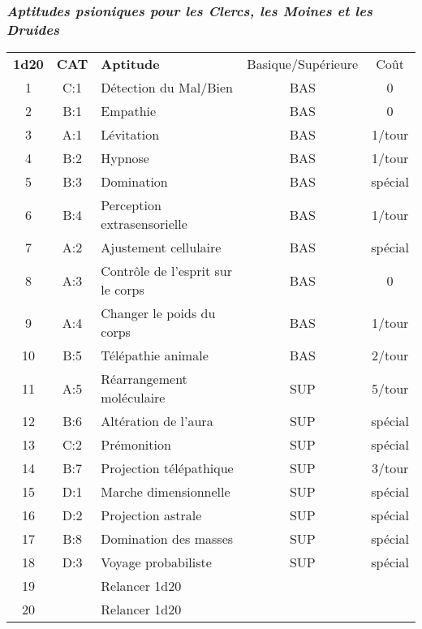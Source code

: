 \newpage
\subsubsection*{\textit{Aptitudes psioniques pour les Clercs, les Moines et les Druides}}

\bigskip

\begin{tabular}{cclcc}
\textbf{1d20} & \textbf{CAT} & \textbf{Aptitude}& Basique/Supérieure & Coût \\
1   & C:1 & Détection du Mal/Bien       & BAS & 0 \\
2   & B:1 & Empathie                    & BAS & 0 \\
3   & A:1 & Lévitation                  & BAS & 1/tour \\
4   & B:2 & Hypnose                     & BAS & 1/tour \\
5   & B:3 & Domination                  & BAS & spécial \\
6   & B:4 & Perception extrasensorielle & BAS & 1/tour \\
7   & A:2 & Ajustement cellulaire       & BAS & spécial \\
8   & A:3 & Contrôle de l'esprit sur le corps & BAS & 0 \\
9   & A:4 & Changer le poids du corps   & BAS & 1/tour \\
10  & B:5 & Télépathie animale          & BAS & 2/tour \\
11  & A:5 & Réarrangement moléculaire   & SUP & 5/tour  \\
12  & B:6 & Altération de l'aura        & SUP & spécial  \\
13  & C:2 & Prémonition                 & SUP & spécial  \\
14  & B:7 & Projection télépathique     & SUP & 3/tour  \\
15  & D:1 & Marche dimensionnelle       & SUP & spécial  \\
16  & D:2 & Projection astrale          & SUP & spécial  \\
17  & B:8 & Domination des masses       & SUP & spécial  \\
18  & D:3 & Voyage probabiliste         & SUP & spécial  \\
19  &     & Relancer 1d20               & & \\
20  &     & Relancer 1d20               & & \\
\end{tabular}

